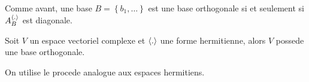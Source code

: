 \documentclass[../main.tex]{subfiles}
\begin{document}
Comme avant, une base $ B=\left\{ b_1, \ldots \right\} $ est une base orthogonale si et seulement si $A_B^{\left\langle.\right\rangle}$ est diagonale.\\
\begin{thm}
Soit $V$ un espace vectoriel complexe et $\left\langle.\right\rangle$ une forme hermitienne, alors $V$ possede une base orthogonale.
\end{thm}
On utilise le procede analogue aux espaces hermitiens.
\end{document}
